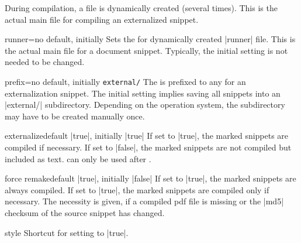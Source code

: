 During compilation, a  file
is dynamically created (several times). This is the actual main file for
compiling an externalized snippet.

\begin{extTcbKey}[][doc new=2015-03-11]{runner}{=}{no default,
  initially \texttt{}}
Sets the  for dynamically created |runner| file.
This is the actual main file for a document snippet.
Typically, the initial setting is not needed to be changed.
\begin{dispListing}
\end{dispListing}
\end{extTcbKey}

\begin{extTcbKey}[][doc new=2015-03-11]{prefix}{=}{no default,
  initially \texttt{external/}}
The  is prefixed to any  for an
externalization snippet. The initial setting implies saving all snippets
into an |external/| subdirectory. Depending on the operation system,
the subdirectory may have to be created manually once.
\begin{dispListing}
\end{dispListing}
\end{extTcbKey}


\begin{extTcbKey}[][doc new=2015-03-11]{externalize}{}{default |true|,
  initially |true|}
If set to |true|, the marked snippets are compiled if necessary.
If set to |false|, the marked snippets are not compiled but included as text.
 can only be used after .
\end{extTcbKey}

\begin{extTcbKey}[][doc new=2015-03-11]{force remake}{}{default |true|,
  initially |false|}
If set to |true|, the marked snippets are always compiled.
If set to |true|, the marked snippets are compiled only if necessary.
The necessity is given, if a compiled pdf file is missing or the
|md5| checksum of the source snippet has changed.
\end{extTcbKey}

\enlargethispage*{1cm}
\begin{extTcbKey}[][doc new and updated={2015-03-11}{2017-02-24}]{\tcbexclamation}{}{style}
  Shortcut for setting  to |true|.
\end{extTcbKey}

